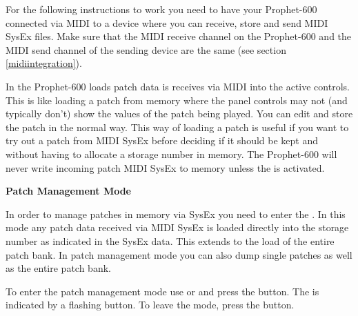 
For the following instructions to work you need to have your Prophet-600 connected via MIDI to a device where you can receive, store and send MIDI SysEx files. Make sure that the MIDI receive channel on the Prophet-600 and the MIDI send channel of the sending device are the same (see section \ref{midiintegration}).

In \presetmode the Prophet-600 loads patch data is receives via MIDI into the active controls. This is like loading a patch from memory where the panel controls may not (and typically don't) show the values of the patch being played. You can edit and store the patch in the normal way. This way of loading a patch is useful if you want to try out a patch from MIDI SysEx before deciding if it should be kept and without having to allocate a storage number in memory. The Prophet-600 will never write incoming patch MIDI SysEx to memory unless the \patchmgmt is activated. 

\textbf{Patch Management Mode}

In order to manage patches in memory via SysEx you need to enter the \patchmgmt. In this mode any patch data received via MIDI SysEx is loaded directly into the storage number as indicated in the SysEx data. This extends to the load of the entire patch bank. In patch management mode you can also dump single patches as well as the entire patch bank. 

To enter the patch management mode use \shiftmode or \shiftlock and press the \record button. The \patchmgmt is indicated by a flashing \preset button. To leave the mode, press the \record button. 

